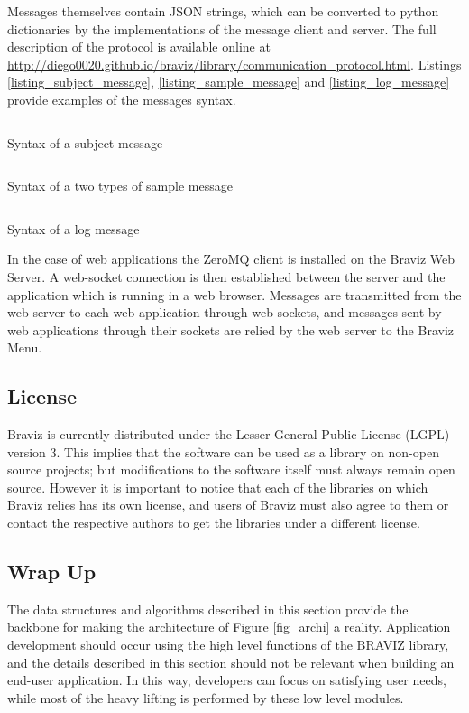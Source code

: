 Messages themselves contain JSON strings, which can be converted to python dictionaries by the implementations of the message client and server. The full description of the protocol is available online at \url{http://diego0020.github.io/braviz/library/communication_protocol.html}. Listings \ref{listing_subject_message}, \ref{listing_sample_message} and  \ref{listing_log_message} provide examples of the messages syntax.

\begin{listing}
\inputminted{js}{code/subject.js}
\caption{Syntax of a subject message}
\label{listing_subject_message}
\end{listing}

\begin{listing}
\inputminted{js}{code/sample.js}
\caption{Syntax of a two types of sample message}
\label{listing_sample_message}
\end{listing}

\begin{listing}
\inputminted{js}{code/log.js}
\caption{Syntax of a log message}
\label{listing_log_message}
\end{listing}

In the case of web applications the ZeroMQ client is installed on the Braviz Web Server. A web-socket connection is then established between the server and the application which is running in a web browser. Messages are transmitted from the web server to each web application through web sockets, and messages sent by web applications through their sockets are relied by the web server to the Braviz Menu.

\subsection{License}

Braviz is currently distributed under the Lesser General Public License (LGPL) version 3. This implies that the software can be used as a library on non-open source projects; but modifications to the software itself must always remain open source. However it is important to notice that each of the libraries on which Braviz relies has its own license, and users of Braviz must also agree to them or contact the respective authors to get the libraries under a different license.

\subsection{Wrap Up}

The data structures and algorithms described in this section provide the backbone for making the architecture of Figure \ref{fig_archi} a reality. Application development should occur using the high level functions of the BRAVIZ library, and the details described in this section should not be relevant when building an end-user application. In this way, developers can focus on satisfying user needs, while most of the heavy lifting is performed by these low level modules. 
